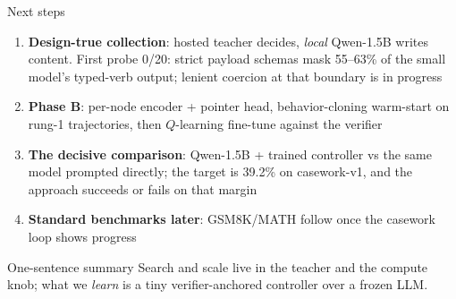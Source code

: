 \documentclass[aspectratio=169]{beamer}
\begin{document}
\begin{frame}{Next steps}
  \begin{enumerate}
    \item \textbf{Design-true collection}: hosted teacher decides,
          \emph{local} Qwen-1.5B writes content. First probe 0/20: strict
          payload schemas mask 55--63\% of the small model's typed-verb
          output; lenient coercion at that boundary is in progress
    \item \textbf{Phase B}: per-node encoder + pointer head,
          behavior-cloning warm-start on rung-1 trajectories, then
          $Q$-learning fine-tune against the verifier
    \item \textbf{The decisive comparison}: Qwen-1.5B + trained controller
          vs the same model prompted directly; the target is
          \alert{39.2\%} on casework-v1, and the approach succeeds or
          fails on that margin
    \item \textbf{Standard benchmarks later}: GSM8K/MATH follow once the
          casework loop shows progress
  \end{enumerate}
  \medskip
  \begin{block}{One-sentence summary}
    Search and scale live in the teacher and the compute knob; what we
    \emph{learn} is a tiny verifier-anchored controller over a frozen LLM.
  \end{block}
\end{frame}
\end{document}
